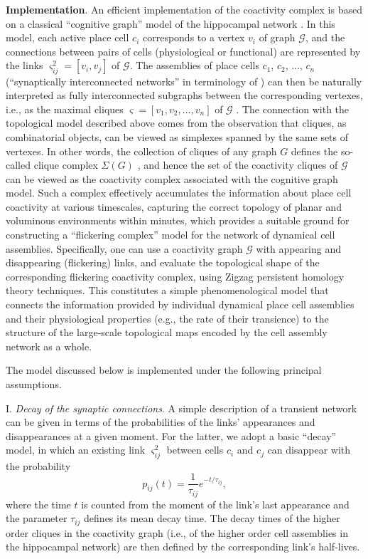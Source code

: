 \documentclass[12pt,tightenlines]{revtex4}
\begin{document}
\textbf{Implementation}. An efficient implementation of the coactivity complex is based on a classical ``cognitive graph'' 
model of the hippocampal network \cite{Burgess,Muller, Babichev2}. In this model, each active place cell $c_i$ corresponds 
to a vertex $v_i$ of graph $\mathcal{G}$, and the connections between pairs of cells (physiological or functional) are 
represented by the links $\varsigma^2_{ij} = [v_i, v_j]$ of $\mathcal{G}$. The assemblies of place cells $c_1$, $c_2$, ..., $c_n$ 
(``synaptically interconnected networks'' in terminology of \cite{Buzsaki1}) can then be naturally interpreted as fully 
interconnected subgraphs between the corresponding vertexes, i.e., as the maximal cliques $\varsigma = [v_1, v_2, \ldots, v_n]$ 
of $\mathcal{G}$ \cite{ Babichev1, Hoffman}. The connection with the topological model described above comes from the 
observation that cliques, as combinatorial objects, can be viewed as simplexes spanned by the same sets of vertexes. 
In other words, the collection of cliques of any graph $G$ defines the so-called clique complex $\Sigma(G)$ \cite{Jonsson}, 
and hence the set of the coactivity cliques of $\mathcal{G}$ can be viewed as the coactivity complex associated with the 
cognitive graph model. Such a complex effectively accumulates the information about place cell coactivity at various timescales, 
capturing the correct topology of planar \cite{Dabaghian,Arai,Basso, Babichev1} and voluminous \cite{Hoffman} environments 
within minutes, which provides a suitable ground for constructing a ``flickering complex'' model for the network of dynamical 
cell assemblies. 
Specifically, one can use a coactivity graph $\mathcal{G}$ with appearing and disappearing (flickering) links, and evaluate 
the topological shape of the corresponding flickering coactivity complex, using Zigzag persistent homology theory techniques. 
This constitutes a simple phenomenological model that connects the information provided by individual dynamical place cell 
assemblies and their physiological properties (e.g., the rate of their transience) to the structure of the large-scale 
topological maps encoded by the cell assembly network as a whole. 

The model discussed below is implemented under the following principal assumptions.

I. \emph{Decay of the synaptic connections}. A simple description of a transient network can be given in terms of the 
probabilities of the links' appearances and disappearances at a given moment. For the latter, we adopt a basic ``decay'' 
model, in which an existing link $\varsigma^2_{ij}$ between cells $c_i$ and $c_j$ can disappear with the probability 
$$p_{ij}(t) = \frac{1}{\tau_{ij}}e^{-t/\tau_{ij}},$$ where the time $t$ is counted from the moment of the link's last 
appearance and the parameter $\tau_{ij}$ defines its mean decay time. The decay times of the higher order cliques in 
the coactivity graph (i.e., of the higher order cell assemblies in the hippocampal network) are then defined by the 
corresponding link's half-lives.
\end{document}
